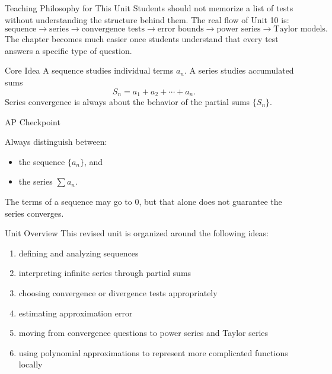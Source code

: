 \documentclass[11pt]{article}
\newcommand{\apcheckpoint}[1]{%
\begin{skillbox}{AP Checkpoint}
#1
\end{skillbox}
}
\begin{document}
\begin{notebox}{Teaching Philosophy for This Unit}
Students should not memorize a list of tests without understanding the structure behind them.
The real flow of Unit 10 is:
\[
\text{sequence} \to \text{series} \to \text{convergence tests} \to \text{error bounds} \to \text{power series} \to \text{Taylor models}.
\]
The chapter becomes much easier once students understand that every test answers a specific type of question.
\end{notebox}

\begin{theorybox}{Core Idea}
A sequence studies individual terms \(a_n\).  
A series studies accumulated sums
\[
S_n=a_1+a_2+\cdots+a_n.
\]
Series convergence is always about the behavior of the partial sums \(\{S_n\}\).
\end{theorybox}

\apcheckpoint{
Always distinguish between:
\begin{itemize}
    \item the sequence \(\{a_n\}\), and
    \item the series \(\sum a_n\).
\end{itemize}
The terms of a sequence may go to \(0\), but that alone does not guarantee the series converges.
}

\begin{theorybox}{Unit Overview}
This revised unit is organized around the following ideas:
\begin{enumerate}
    \item defining and analyzing sequences
    \item interpreting infinite series through partial sums
    \item choosing convergence or divergence tests appropriately
    \item estimating approximation error
    \item moving from convergence questions to power series and Taylor series
    \item using polynomial approximations to represent more complicated functions locally
\end{enumerate}
\end{theorybox}
\end{document}
